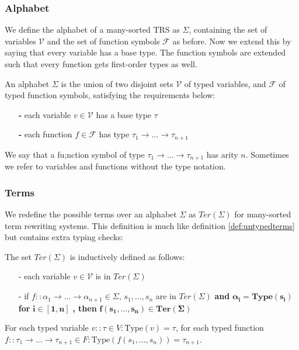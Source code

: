 \subsubsection{Alphabet}
We define the alphabet of a many-sorted TRS as $\Sigma$, containing the set of variables $\mathcal{V}$ and the set of function symbols $\mathcal{F}$ as before. Now we extend this by saying that every variable has a base type. The function symbols are extended such that every function gets first-order types as well. 
\begin{definition}
An alphabet $\Sigma$ is the union of two disjoint sets $\mathcal{V}$ of typed variables, and $\mathcal{F}$ of typed function symbols, satisfying the requirements below:
\begin{itemize}
    \itemsep -0.4em
    \item[\bf-] each variable $v \in \mathcal{V}$ has a base type $\tau$
    \item[\bf-] each function $f \in \mathcal{F}$ has type $\tau_1 \rightarrow \dots \rightarrow \tau_{n+1}$
\end{itemize}
We say that a fu;nction symbol of type $\tau_1 \rightarrow \dots \rightarrow \tau_{n+1}$ has arity $n$. Sometimes we refer to variables and functions without the type notation.
\end{definition}

\subsubsection{Terms}
We redefine the possible terms over an alphabet $\Sigma$ as $\textit{Ter}\left(\Sigma\right)$ for many-sorted term rewriting systems. This definition is much like definition \ref{def:untypedterms} but contains extra typing checks: 
\begin{definition}
The set $\textit{Ter}\left(\Sigma\right)$ is inductively defined as follows:
\begin{itemize}
    \itemsep -0.5em
    \item[-] each variable $v \in \mathcal{V}$ is in $\textit{Ter}\left(\Sigma\right)$
    \item[-] if $f :: \alpha_1 \rightarrow \dots \rightarrow \alpha_{n+1} \in \Sigma$, $s_1, \dots, s_n$ are in $\textit{Ter}\left(\Sigma\right)$ \textbf{and} $\bm{\alpha_i = \textbf{Type}(s_i)}$ \textbf{ for } $\bm{i \in [1, n]}$ \textbf{, then } $\bm{f(s_1, ..., s_n) \in \textbf{Ter}(\Sigma)}$
\end{itemize}
For each typed variable $v :: \tau \in V: \text{Type}(v) = \tau$, for each typed function $f :: \tau_1 \rightarrow \dots \rightarrow \tau_{n+1} \in F: \text{Type}(f(s_1, \dots, s_n)) = \tau_{n+1}$.
\end{definition}

